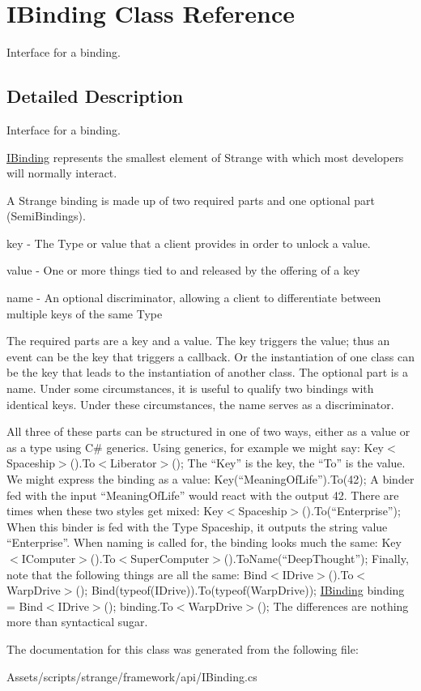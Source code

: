 \hypertarget{class_i_binding}{\section{I\-Binding Class Reference}
\label{class_i_binding}
}


Interface for a binding.  




\subsection{Detailed Description}
Interface for a binding. 

\hyperlink{class_i_binding}{I\-Binding} represents the smallest element of Strange with which most developers will normally interact.

A Strange binding is made up of two required parts and one optional part (Semi\-Bindings). 
\begin{DoxyItemize}
\item key -\/ The Type or value that a client provides in order to unlock a value. 
\item value -\/ One or more things tied to and released by the offering of a key 
\item name -\/ An optional discriminator, allowing a client to differentiate between multiple keys of the same Type 
\end{DoxyItemize}

The required parts are a key and a value. The key triggers the value; thus an event can be the key that triggers a callback. Or the instantiation of one class can be the key that leads to the instantiation of another class. The optional part is a name. Under some circumstances, it is useful to qualify two bindings with identical keys. Under these circumstances, the name serves as a discriminator. \par
 All three of these parts can be structured in one of two ways, either as a value or as a type using C\# generics. Using generics, for example we might say\-: {\ttfamily Key$<$\-Spaceship$>$().To$<$\-Liberator$>$();} The “\-Key” is the key, the “\-To” is the value. We might express the binding as a value\-: {\ttfamily Key(“\-Meaning\-Of\-Life”).To(42);} A binder fed with the input “\-Meaning\-Of\-Life” would react with the output 42. There are times when these two styles get mixed\-: {\ttfamily Key$<$\-Spaceship$>$().To(“\-Enterprise”);} When this binder is fed with the Type Spaceship, it outputs the string value “\-Enterprise”. When naming is called for, the binding looks much the same\-: {\ttfamily Key$<$\-I\-Computer$>$().To$<$\-Super\-Computer$>$().To\-Name(“\-Deep\-Thought”);} Finally, note that the following things are all the same\-: {\ttfamily Bind$<$\-I\-Drive$>$().To$<$\-Warp\-Drive$>$();} {\ttfamily Bind(typeof(\-I\-Drive)).To(typeof(\-Warp\-Drive));} {\ttfamily \hyperlink{class_i_binding}{I\-Binding} binding = Bind$<$\-I\-Drive$>$(); binding.\-To$<$\-Warp\-Drive$>$();} The differences are nothing more than syntactical sugar. 

The documentation for this class was generated from the following file\-:\begin{DoxyCompactItemize}
\item 
Assets/scripts/strange/framework/api/I\-Binding.\-cs\end{DoxyCompactItemize}
